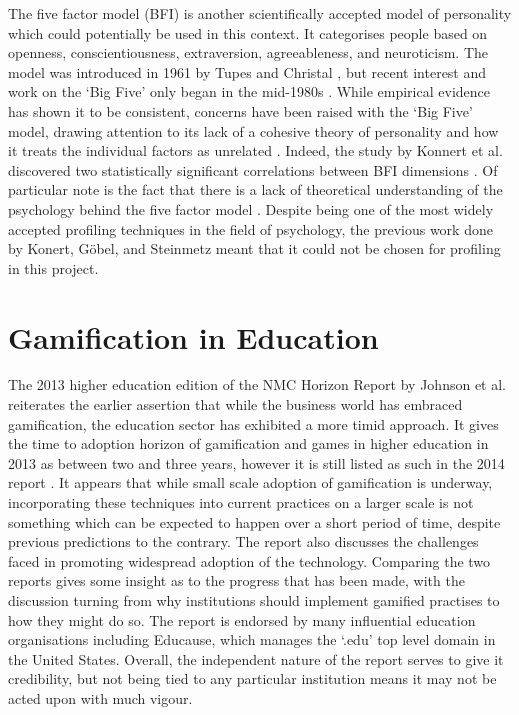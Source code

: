 \documentclass[12pt,a4paper,twoside]{report}
\begin{document}
The five factor model (BFI) is another scientifically accepted model of personality which could potentially be used in this context. It categorises people based on openness, conscientiousness, extraversion, agreeableness, and neuroticism. The model was introduced in 1961 by Tupes and Christal \cite{tupes1961}, but recent interest and work on the `Big Five' only began in the mid-1980s \cite{john1999big}. While empirical evidence has shown it to be consistent, concerns have been raised with the `Big Five' model, drawing attention to its lack of a cohesive theory of personality and how it treats the individual factors as unrelated \cite{block2010five} \cite{eysenck1992four}. Indeed, the study by Konnert et al. discovered two statistically significant correlations between BFI dimensions \cite{konertmodeling}. Of particular note is the fact that there is a lack of theoretical understanding of the psychology behind the five factor model \cite{eysenck1992four} \cite{john1999big}. Despite being one of the most widely accepted profiling techniques in the field of psychology, the previous work done by Konert, G{\"o}bel, and Steinmetz \cite{konertmodeling} meant that it could not be chosen for profiling in this project.

\section{Gamification in Education}
The 2013 higher education edition of the NMC Horizon Report by Johnson et al. \cite{johnson2013nmc} reiterates the earlier assertion that while the business world has embraced gamification, the education sector has exhibited a more timid approach. It gives the time to adoption horizon of gamification and games in higher education in 2013 as between two and three years, however it is still listed as such in the 2014 report \cite{johnson2014nmc}. It appears that while small scale adoption of gamification is underway, incorporating these techniques into current practices on a larger scale is not something which can be expected to happen over a short period of time, despite previous predictions to the contrary. The report also discusses the challenges faced in promoting widespread adoption of the technology. Comparing the two reports gives some insight as to the progress that has been made, with the discussion turning from why institutions should implement gamified practises to how they might do so. The report is endorsed by many influential education organisations including Educause, which manages the `.edu' top level domain in the United States.  Overall, the independent nature of the report serves to give it credibility, but not being tied to any particular institution means it may not be acted upon with much vigour.
\end{document}
